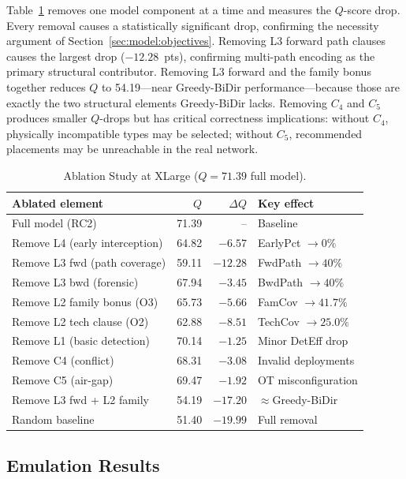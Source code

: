 \documentclass[journal]{IEEEtran}
\newcommand{\qscore}{$Q$-score}
\begin{document}
Table~\ref{tab:ablation} removes one model component at a time and
measures the \qscore{} drop. Every removal causes a statistically
significant drop, confirming the necessity argument of
Section~\ref{sec:model:objectives}. Removing L3 forward path clauses
causes the largest drop ($-12.28$~pts), confirming multi-path
encoding as the primary structural contributor. Removing L3 forward
and the family bonus together reduces $Q$ to 54.19---near
Greedy-BiDir performance---because those are exactly the two
structural elements Greedy-BiDir lacks. Removing $C_4$ and $C_5$
produces smaller $Q$-drops but has critical correctness implications:
without $C_4$, physically incompatible types may be selected;
without $C_5$, recommended placements may be unreachable in the
real network.

\begin{table}[t]
\caption{Ablation Study at XLarge ($Q=71.39$ full model).}
\label{tab:ablation}
\centering
\renewcommand{\arraystretch}{1.2}
\begin{tabular}{lrrl}
\toprule
Ablated element & $Q$ & $\Delta Q$ & Key effect \\
\midrule
Full model (RC2)               & 71.39 & -- & Baseline \\
Remove L4 (early interception) & 64.82 & $-6.57$ & EarlyPct $\to 0\%$ \\
Remove L3 fwd (path coverage)  & 59.11 & $-12.28$ & FwdPath $\to 40\%$ \\
Remove L3 bwd (forensic)       & 67.94 & $-3.45$ & BwdPath $\to 40\%$ \\
Remove L2 family bonus (O3)    & 65.73 & $-5.66$ & FamCov $\to 41.7\%$ \\
Remove L2 tech clause (O2)     & 62.88 & $-8.51$ & TechCov $\to 25.0\%$ \\
Remove L1 (basic detection)    & 70.14 & $-1.25$ & Minor DetEff drop \\
Remove C4 (conflict)           & 68.31 & $-3.08$ & Invalid deployments \\
Remove C5 (air-gap)            & 69.47 & $-1.92$ & OT misconfiguration \\
Remove L3 fwd + L2 family      & 54.19 & $-17.20$ & $\approx$Greedy-BiDir \\
Random baseline                & 51.40 & $-19.99$ & Full removal \\
\bottomrule
\end{tabular}
\end{table}

\subsection{Emulation Results}
\label{sec:results:emulation}
\end{document}
